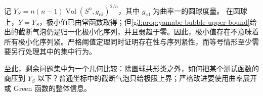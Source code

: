 \begin{example}\label{g3:exm:yamabe-threshold-sharpness}
	记 \(Y_S=n(n-1)\operatorname{Vol}(S^n,g_{\mathrm{rd}})^{2/n}\)，其中 \(g_{\mathrm{rd}}\) 为曲率一的圆球度量。
	在圆球上，\(Y=Y_S\)，极小值已由常函数取得；但\cref{g3:prop:yamabe-bubble-upper-bound}给出的截断气泡仍是归一化极小化序列，并且弱趋于零。因此，极小值存在不意味着所有极小化序列紧。严格阈值定理同时证明存在性与序列紧性，而等号情形至少需要另行处理其中的集中行为。
\end{example}

至此，剩余问题集中为一个几何比较：除圆球共形类之外，如何把某个测试函数的商压到 \(Y_S\) 以下？普通坐标中的截断气泡只给极限上界；严格改进要使用曲率展开或 Green 函数的整体信息。
